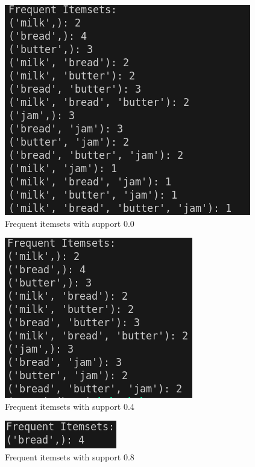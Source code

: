 \documentclass{article}
\begin{document}
\begin{figure}[H]
    \centering
    \includegraphics[width=\textwidth]{transactions_frequent_itemsets00.png}
    \caption{Frequent itemsets with support 0.0}
\end{figure}

\begin{figure}[H]
    \centering
    \includegraphics[width=\textwidth]{transactions_frequent_itemsets04.png}
    \caption{Frequent itemsets with support 0.4}
\end{figure}

\begin{figure}[H]
    \centering
    \includegraphics[width=\textwidth]{transactions_frequent_itemsets08.png}
    \caption{Frequent itemsets with support 0.8}
\end{figure}
\end{document}
